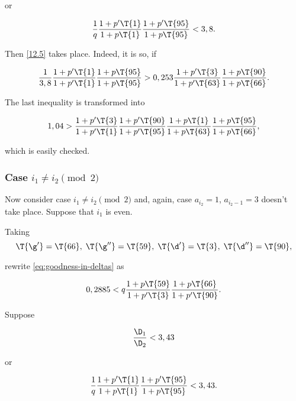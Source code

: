 or

\begin{equation*}
	\dfrac{1}{q}
	\dfrac{1 + p' \T{1}}{1 + p \T{1}}
	\dfrac{1 + p' \T{95}}{1 + p \T{95}}
	<
	3,8.
\end{equation*}

Then \ref{12.5} takes place. Indeed, it is so, if

\begin{equation*}
	\dfrac{1}{3,8}
	\dfrac{1 + p' \T{1}}{1 + p' \T{1}}
	\dfrac{1 + p \T{95}}{1 + p \T{95}}
	>
	0,253
	\dfrac{1 + p' \T{3}}{1 + p' \T{63}}
	\dfrac{1 + p \T{90}}{1 + p \T{66}}.
\end{equation*}

The last inequality is transformed into

\begin{equation*}
	1,04
	>
	\dfrac{1 + p' \T{3}}{1 + p' \T{1}}
	\dfrac{1 + p' \T{90}}{1 + p' \T{95}}
	\dfrac{1 + p \T{1}}{1 + p \T{63}}
	\dfrac{1 + p \T{95}}{1 + p \T{66}},
\end{equation*}

which is easily checked.

\subsubsection{Case $i_1 \ne i_2 \pmod 2$}

Now consider case $i_1 \ne i_2 \pmod 2$
and, again, case $a_{i_2} = 1$, $a_{i_2 - 1} = 3$
doesn't take place.
Suppose that $i_1$ is even.


Taking
\begin{equation*}
	\T{\g'} = \T{66},\;
	\T{\g''} = \T{59},\;
	\T{\d'} = \T{3},\;
	\T{\d''} = \T{90},
\end{equation*}

rewrite \ref{eq:goodness-in-deltas} as

\begin{equation}\label{12.9}
	0,2885
	<
	q
	\dfrac{1 + p \T{59}}{1 + p' \T{3}}
	\dfrac{1 + p \T{66}}{1 + p' \T{90}}.
\end{equation}

Suppose

\begin{equation}\label{goodness_condition_3,43}
	\dfrac{\D_1}{\D_2} < 3,43
\end{equation}

or

\begin{equation*}
	\dfrac{1}{q}
	\dfrac{1 + p' \T{1}}{1 + p \T{1}}
	\dfrac{1 + p' \T{95}}{1 + p \T{95}}
	<
	3,43.
\end{equation*}

